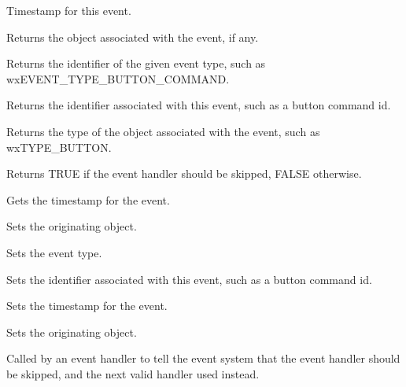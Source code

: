 
Timestamp for this event.



Returns the object associated with the
event, if any.



Returns the identifier of the given event type,
such as wxEVENT\_TYPE\_BUTTON\_COMMAND.



Returns the identifier associated with this event, such as a button command id.



Returns the type of the object associated with the
event, such as wxTYPE\_BUTTON.



Returns TRUE if the event handler should be skipped, FALSE otherwise.



Gets the timestamp for the event.



Sets the originating object.



Sets the event type.



Sets the identifier associated with this event, such as a button command id.



Sets the timestamp for the event.

Sets the originating object.

\label{wxeventskip}


Called by an event handler to tell the event system that the
event handler should be skipped, and the next valid handler used
instead.

